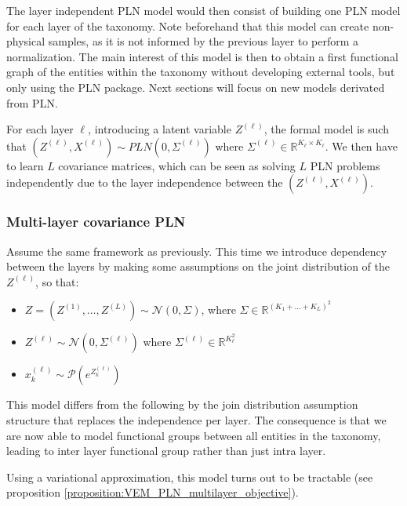 \medskip

The layer independent PLN model would then consist of building one PLN model for each layer of the taxonomy.
Note beforehand that this model can create non-physical samples, as it is not informed by the previous layer to perform a normalization.
The main interest of this model is then to obtain a first functional graph of the entities within the taxonomy without developing external tools, but only using the PLN package.
Next sections will focus on new models derivated from PLN.

\medskip

For each layer $\ell$, introducing a latent variable $Z^{(\ell)}$, the formal model is such that $(Z^{(\ell)}, X^{(\ell)}) \sim PLN(0, \Sigma^{(\ell)})$  where $\Sigma^{(\ell)} \in \mathbb{R}^{K_{\ell} \times K_{\ell}}$.
We then have to learn $L$ covariance matrices, which can be seen as solving $L$ PLN problems independently due to the layer independence between the $(Z^{(\ell)}, X^{(\ell)})$.

\subsubsection{Multi-layer covariance PLN}

Assume the same framework as previously.
This time we introduce dependency between the layers by making some assumptions on the joint distribution of the $Z^{(\ell)}$, so that:
\begin{itemize}
    \item $Z = (Z^{(1)}, \dots, Z^{(L)}) \sim \mathcal{N}(0, \Sigma)$, where $\Sigma \in \mathbb{R}^{(K_1 + \dots + K_{L})^2}$
    \item $Z^{(\ell)} \sim \mathcal{N}(0, \Sigma^{(\ell)})$ where $\Sigma^{(\ell)} \in \mathbb{R}^{K_{\ell}^2}$
    \item $x_k^{(\ell)} \sim \mathcal{P}(e^{Z_k^{(\ell)}})$
\end{itemize}

This model differs from the following by the join distribution assumption structure that replaces the independence per layer.
The consequence is that we are now able to model functional groups between all entities in the taxonomy, leading to inter layer functional group rather than just intra layer.

\medskip

Using a variational approximation, this model turns out to be tractable (see proposition \ref{proposition:VEM_PLN_multilayer_objective}).
